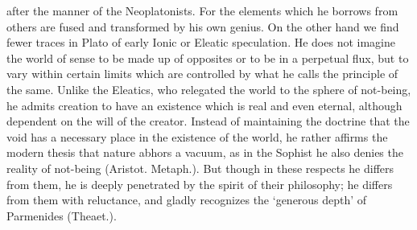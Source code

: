 after the manner of the Neoplatonists. For the elements which he borrows
from others are fused and transformed by his own genius. On the other hand
we find fewer traces in Plato of early Ionic or Eleatic speculation. He
does not imagine the world of sense to be made up of opposites or to be in
a perpetual flux, but to vary within certain limits which are controlled
by what he calls the principle of the same. Unlike the Eleatics, who
relegated the world to the sphere of not-being, he admits creation to have
an existence which is real and even eternal, although dependent on the
will of the creator. Instead of maintaining the doctrine that the void has
a necessary place in the existence of the world, he rather affirms the
modern thesis that nature abhors a vacuum, as in the Sophist he also
denies the reality of not-being (Aristot. Metaph.). But though in these
respects he differs from them, he is deeply penetrated by the spirit of
their philosophy; he differs from them with reluctance, and gladly
recognizes the ‘generous depth’ of Parmenides (Theaet.).

